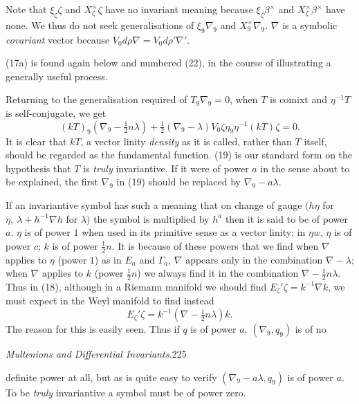 \documentclass[11pt]{article}
\begin{document}
\indent Note that $\xi_\zeta\zeta$ and $X_\zeta^\times\zeta$ have no invariant meaning because $\xi_\zeta\beta^\times$ and $X_\zeta^\times\beta^\times$ have none. We thus do not seek generalisations of $\xi_9\nabla_9$ and $X_9^\times\nabla_9$. $\nabla$ is a symbolic \emph{covariant} vector because $V_0d\rho\nabla=V_0d\rho'\nabla'$.

\indent (17a) is found again below and numbered (22), in the course of illustrating a generally useful process.

\indent Returning to the generalisation required of $T_9\nabla_9=0$, when $T$ is comixt and $\eta^{-1}T$ is self-conjugate, we get
\begin{equation}(kT)_9(\nabla_9-\tfrac12n\lambda)+\tfrac12(\nabla_9-\lambda)V_0\zeta\eta_9\eta^{-1}(kT)\zeta=0.\tag{19}\end{equation}
It is clear that $kT$, a vector linity \emph{density} as it is called, rather than $T$ itself, should be regarded as the fundamental function. (19) is our standard form on the hypothesis that $T$ is \emph{truly} invariantive. If it were of power $a$ in the sense about to be explained, the first $\nabla_9$ in (19) should be replaced by $\nabla_9-a\lambda$.

\indent If an invariantive symbol has such a meaning that on change of gauge $(h\eta$ for $\eta,\ \lambda+h^{-1}\nabla h$ for $\lambda)$ the symbol is multiplied by $h^a$ then it is said to be of power $a$. $\eta$ is of power $1$ when used in its primitive sense as a vector linity; in $\eta w$, $\eta$ is of power $c$; $k$ is of power $\tfrac12n$. It is because of these powers that we find when $\nabla$ applies to $\eta$ (power $1$) as in $E_a$ and $\Gamma_a$, $\nabla$ appears only in the combination $\nabla-\lambda$; when $\nabla$ applies to $k$ (power $\tfrac12n$) we always find it in the combination $\nabla-\tfrac12n\lambda$. Thus in (18), although in a Riemann manifold we should find $E_\zeta'\zeta=k^{-1}\nabla k$, we must expect in the Weyl manifold to find instead
\[
E_\zeta'\zeta=k^{-1}(\nabla-\tfrac12n\lambda)k.
\]
The reason for this is easily seen. Thus if $q$ is of power $a$, $(\nabla_9,q_9)$ is of no
\newpage\thispagestyle{empty}\begin{center}\textit{Multenions and Differential Invariants.}\hfill 225\end{center}
definite power at all, but as is quite easy to verify $(\nabla_9-a\lambda,q_9)$ is of power $a$.
To be \emph{truly} invariantive a symbol must be of power zero.
\end{document}
